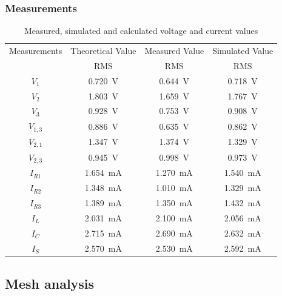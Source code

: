 \documentclass[letterpaper]{article}
\begin{document}
\subsubsection{Measurements}
\begin{table}[H]
    \centering
    \begin{tabular}{|c|c|c|c|}
        \hline
        Measurements & Theoretical Value & Measured Value & Simulated Value\\
         & RMS & RMS & RMS\\\hline
        $V_1$ & \SI{0.720}{\volt} & \SI{0.644}{\volt} & \SI{0.718}{\volt}\\\hline 
        $V_2$ & \SI{1.803}{\volt} & \SI{1.659}{\volt} & \SI{1.767}{\volt}\\\hline 
        $V_3$ & \SI{0.928}{\volt} & \SI{0.753}{\volt} & \SI{0.908}{\volt}\\\hline 
        $V_{1,3}$ & \SI{0.886}{\volt} & \SI{0.635}{\volt} & \SI{0.862}{\volt}\\\hline 
        $V_{2,1}$ & \SI{1.347}{\volt} & \SI{1.374}{\volt} & \SI{1.329}{\volt}\\\hline 
        $V_{2,3}$ & \SI{0.945}{\volt} & \SI{0.998}{\volt} & \SI{0.973}{\volt}\\\hline 
        $I_{R1}$ & \SI{1.654}{\milli\ampere} & \SI{1.270}{\milli\ampere} & \SI{1.540}{\milli\ampere}\\\hline 
        $I_{R2}$ & \SI{1.348}{\milli\ampere} & \SI{1.010}{\milli\ampere} & \SI{1.329}{\milli\ampere}\\\hline 
        $I_{R3}$ & \SI{1.389}{\milli\ampere} & \SI{1.350}{\milli\ampere} & \SI{1.432}{\milli\ampere}\\\hline 
        $I_L$ & \SI{2.031}{\milli\ampere} & \SI{2.100}{\milli\ampere} & \SI{2.056}{\milli\ampere}\\\hline 
        $I_C$ & \SI{2.715}{\milli\ampere} & \SI{2.690}{\milli\ampere} & \SI{2.632}{\milli\ampere}\\\hline 
        $I_S$ & \SI{2.570}{\milli\ampere} & \SI{2.530}{\milli\ampere} & \SI{2.592}{\milli\ampere}\\\hline 
    \end{tabular}
    \caption{Measured, simulated and calculated voltage and current values}
\end{table}
\subsection{Mesh analysis}
\end{document}
